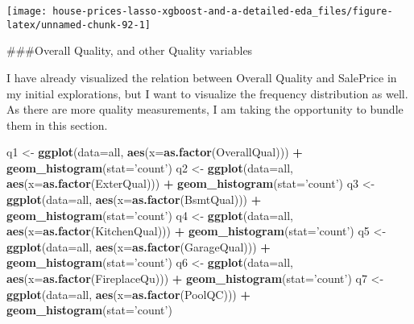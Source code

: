 \documentclass[]{article}
\newenvironment{Shaded}{\begin{snugshade}}{\end{snugshade}}
\newcommand{\DataTypeTok}[1]{\textcolor[rgb]{0.13,0.29,0.53}{#1}}
\newcommand{\KeywordTok}[1]{\textcolor[rgb]{0.13,0.29,0.53}{\textbf{#1}}}
\newcommand{\NormalTok}[1]{#1}
\newcommand{\OperatorTok}[1]{\textcolor[rgb]{0.81,0.36,0.00}{\textbf{#1}}}
\newcommand{\StringTok}[1]{\textcolor[rgb]{0.31,0.60,0.02}{#1}}
\begin{document}
\texttt{[image: house-prices-lasso-xgboost-and-a-detailed-eda\_files/figure-latex/unnamed-chunk-92-1]}

\#\#\#Overall Quality, and other Quality variables

I have already visualized the relation between Overall Quality and
SalePrice in my initial explorations, but I want to visualize the
frequency distribution as well. As there are more quality measurements,
I am taking the opportunity to bundle them in this section.

\begin{Shaded}
\begin{Highlighting}[]
\NormalTok{q1 <-}\StringTok{ }\KeywordTok{ggplot}\NormalTok{(}\DataTypeTok{data=}\NormalTok{all, }\KeywordTok{aes}\NormalTok{(}\DataTypeTok{x=}\KeywordTok{as.factor}\NormalTok{(OverallQual))) }\OperatorTok{+}
\StringTok{        }\KeywordTok{geom_histogram}\NormalTok{(}\DataTypeTok{stat=}\StringTok{'count'}\NormalTok{)}
\NormalTok{q2 <-}\StringTok{ }\KeywordTok{ggplot}\NormalTok{(}\DataTypeTok{data=}\NormalTok{all, }\KeywordTok{aes}\NormalTok{(}\DataTypeTok{x=}\KeywordTok{as.factor}\NormalTok{(ExterQual))) }\OperatorTok{+}
\StringTok{        }\KeywordTok{geom_histogram}\NormalTok{(}\DataTypeTok{stat=}\StringTok{'count'}\NormalTok{)}
\NormalTok{q3 <-}\StringTok{ }\KeywordTok{ggplot}\NormalTok{(}\DataTypeTok{data=}\NormalTok{all, }\KeywordTok{aes}\NormalTok{(}\DataTypeTok{x=}\KeywordTok{as.factor}\NormalTok{(BsmtQual))) }\OperatorTok{+}
\StringTok{        }\KeywordTok{geom_histogram}\NormalTok{(}\DataTypeTok{stat=}\StringTok{'count'}\NormalTok{)}
\NormalTok{q4 <-}\StringTok{ }\KeywordTok{ggplot}\NormalTok{(}\DataTypeTok{data=}\NormalTok{all, }\KeywordTok{aes}\NormalTok{(}\DataTypeTok{x=}\KeywordTok{as.factor}\NormalTok{(KitchenQual))) }\OperatorTok{+}
\StringTok{        }\KeywordTok{geom_histogram}\NormalTok{(}\DataTypeTok{stat=}\StringTok{'count'}\NormalTok{)}
\NormalTok{q5 <-}\StringTok{ }\KeywordTok{ggplot}\NormalTok{(}\DataTypeTok{data=}\NormalTok{all, }\KeywordTok{aes}\NormalTok{(}\DataTypeTok{x=}\KeywordTok{as.factor}\NormalTok{(GarageQual))) }\OperatorTok{+}
\StringTok{        }\KeywordTok{geom_histogram}\NormalTok{(}\DataTypeTok{stat=}\StringTok{'count'}\NormalTok{)}
\NormalTok{q6 <-}\StringTok{ }\KeywordTok{ggplot}\NormalTok{(}\DataTypeTok{data=}\NormalTok{all, }\KeywordTok{aes}\NormalTok{(}\DataTypeTok{x=}\KeywordTok{as.factor}\NormalTok{(FireplaceQu))) }\OperatorTok{+}
\StringTok{        }\KeywordTok{geom_histogram}\NormalTok{(}\DataTypeTok{stat=}\StringTok{'count'}\NormalTok{)}
\NormalTok{q7 <-}\StringTok{ }\KeywordTok{ggplot}\NormalTok{(}\DataTypeTok{data=}\NormalTok{all, }\KeywordTok{aes}\NormalTok{(}\DataTypeTok{x=}\KeywordTok{as.factor}\NormalTok{(PoolQC))) }\OperatorTok{+}
\StringTok{        }\KeywordTok{geom_histogram}\NormalTok{(}\DataTypeTok{stat=}\StringTok{'count'}\NormalTok{)}


\end{Highlighting}
\end{Shaded}
\end{document}
